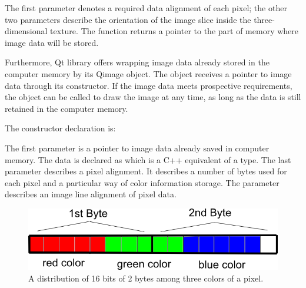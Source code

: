 
The first parameter denotes a required data alignment of each pixel; the other two parameters describe the orientation of the image slice inside the three-dimensional texture. The function returns a pointer to the part of memory where image data will be stored.

Furthermore, Qt library offers wrapping image data already stored in the computer memory by its Qimage object. The object receives a pointer to image data through its constructor. If the image data meets prospective requirements, the object can be called to draw the image at any time, as long as the data is still retained in the computer memory.

The constructor declaration is:


The first parameter is a pointer to image data already saved in computer memory. The data is declared as  which is a C++ equivalent of a  type. The last parameter  describes a pixel alignment. It describes a number of bytes used for each pixel and a particular way of color information storage. The  parameter describes an image line alignment of pixel data.



\begin{figure}
	\begin{center}
	\includegraphics[width=130mm]{Text/IMG/ImageStoring_16bit.png}
	\end{center}
	\caption{A distribution of 16 bits of 2 bytes among three colors of a pixel.}
	\label{imagestoring}
\end{figure}

